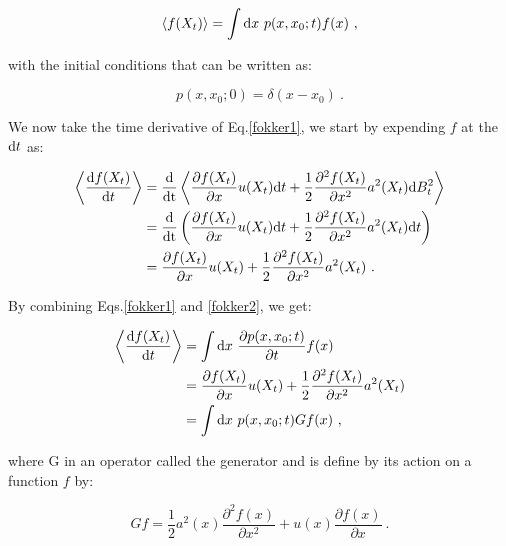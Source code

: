 \begin{equation}
	\langle f(X_t) \rangle = \int \textnormal{d}x ~ p(x, x_0 ; t) f(x) ~,
	\label{fokker1}
\end{equation}

with the initial conditions that can be written as:

\begin{equation}
	p(x, x_0; 0) = \delta (x - x_0) ~.
\end{equation}

We now take the time derivative of Eq.\ref{fokker1}, we start by expending $ f$ at the $\textnormal{d}t$ as:

\begin{equation}
	\begin{aligned}
	\left\langle \frac{\textnormal{d}f(X_t)}{\textnormal{d}t} \right\rangle  &= \frac{\textnormal{d}}{\textnormal{dt}}\left\langle   \frac{\partial f(X_t)}{\partial x} u(X_t) \textnormal{d}t + \frac{1}{2} \frac{\partial^2 f(X_t)}{\partial x^2} a^2 (X_t) \textnormal{d}B_t^2   \right\rangle \\
	& =  \frac{\textnormal{d}}{\textnormal{dt}} \left( \frac{\partial f(X_t)}{\partial x} u(X_t) \textnormal{d}t + \frac{1}{2} \frac{\partial^2 f(X_t)}{\partial x^2} a^2 (X_t) \textnormal{d}t \right) \\
	& = \frac{\partial f(X_t)}{\partial x} u(X_t) + \frac{1}{2} \frac{\partial^2 f(X_t)}{\partial x^2} a^2 (X_t) ~.
	\end{aligned}
	\label{fokker2}
\end{equation}

By combining Eqs.\ref{fokker1} and \ref{fokker2}, we get:

\begin{equation}
	\begin{aligned}
	\left\langle \frac{\textnormal{d}f(X_t)}{\textnormal{d}t} \right\rangle &= \int \textnormal{d} x ~\frac{\partial p(x, x_0 ; t) }{\partial t} f(x) \\
	& =  \frac{\partial f(X_t)}{\partial x} u(X_t) + \frac{1}{2} \frac{\partial^2 f(X_t)}{\partial x^2} a^2 (X_t) \\
	& = \int \textnormal{d}x ~ p(x, x_0 ; t) G f(x) ~,
	\end{aligned}
\end{equation}

where G in an operator called the generator and is define by its action on a function $f$ by:

\begin{equation}
	Gf = \frac{1}{2} a^2 (x) \frac{\partial ^2 f(x)}{\partial x^2} + u(x) \frac{\partial f(x)}{\partial x} ~.
\end{equation}

